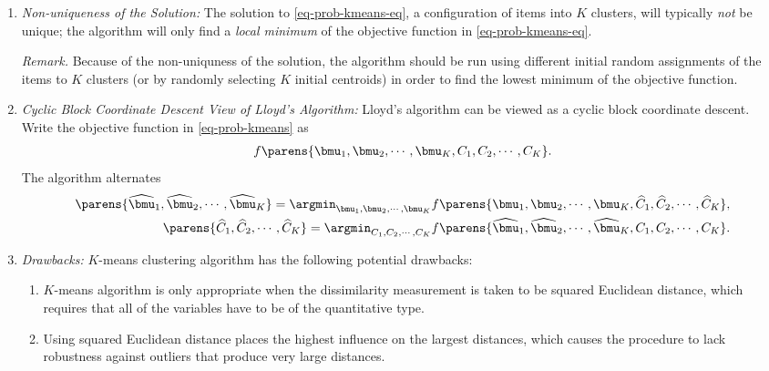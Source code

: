 \documentclass[12pt]{article}
\begin{document}
\begin{enumerate}[label=\textbf{\arabic*.}]
\begin{enumerate}
		\item \textit{Non-uniqueness of the Solution:} The solution to \eqref{eq-prob-kmeans-eq}, a configuration of items into $K$ clusters, will typically \emph{not} be unique; the algorithm will only find a \emph{local minimum} of the objective function in \eqref{eq-prob-kmeans-eq}. 
		
		\textit{Remark.} Because of the non-uniquness of the solution, the algorithm should be run using different initial random assignments of the items to $K$ clusters (or by randomly selecting $K$ initial centroids) in order to find the lowest minimum of the objective function. 
		
		\item \textit{Cyclic Block Coordinate Descent View of Lloyd's Algorithm:} Lloyd's algorithm can be viewed as a cyclic block coordinate descent. Write the objective function in \eqref{eq-prob-kmeans} as 
		\begin{align*}
			f \parens{\bmu_1, \bmu_2, \cdots, \bmu_K, C_1, C_2, \cdots, C_K}. 
		\end{align*}
		The algorithm alternates 
		\begin{align*}
			\parens{\widehat{\bmu}_1, \widehat{\bmu}_2, \cdots, \widehat{\bmu}_K} = \argmin_{\bmu_1, \bmu_2, \cdots, \bmu_K} f \parens{\bmu_1, \bmu_2, \cdots, \bmu_K, \widehat{C}_1, \widehat{C}_2, \cdots, \widehat{C}_K}, \\ 
			\parens{\widehat{C}_1, \widehat{C}_2, \cdots, \widehat{C}_K} = \argmin_{C_1, C_2, \cdots, C_K} f \parens{\widehat{\bmu}_1, \widehat{\bmu}_2, \cdots, \widehat{\bmu}_K, C_1, C_2, \cdots, C_K}. 
		\end{align*}
		
		\item \textit{Drawbacks:} $K$-means clustering algorithm has the following potential drawbacks: 
		\begin{enumerate}
			\item $K$-means algorithm is only appropriate when the dissimilarity measurement is taken to be squared Euclidean distance, which requires that all of the variables have to be of the quantitative type. 
			\item Using squared Euclidean distance places the highest influence on the largest distances, which causes the procedure to lack robustness against outliers that produce very large distances. 
		\end{enumerate}
		
	\end{enumerate}
	

\end{enumerate}
\end{document}

